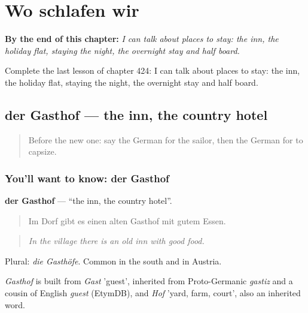 
\chapter{Wo schlafen wir}
\label{ch:ge-wo-schlafen-wir}

\begin{chapteropening}
\textbf{By the end of this chapter:} \emph{I can talk about places to stay: the inn, the holiday flat, staying the night, the overnight stay and half board.}

Complete the last lesson of chapter 424: I can talk about places to stay: the inn, the holiday flat, staying the night, the overnight stay and half board.
\end{chapteropening}

\section[der Gasthof]{der Gasthof — the inn, the country hotel}

\label{lesson:GE-C424-gasthof}



\begin{quote}
Before the new one: say the German for the sailor, then the German for to capsize.
\end{quote}

\subsection*{You'll want to know: der Gasthof}
\textbf{der Gasthof} — \textquotedblleft{}the inn, the country hotel\textquotedblright{}.

\begin{quote}
Im Dorf gibt es einen alten Gasthof mit gutem Essen.
\end{quote}

\begin{quote}
\emph{In the village there is an old inn with good food.}
\end{quote}

Plural: \emph{die Gasthöfe}. Common in the south and in Austria.

\begin{cousinweb}
\emph{Gasthof} is built from \emph{Gast} 'guest', inherited from Proto-Germanic \emph{gastiz} and a cousin of English \emph{guest} (EtymDB), and \emph{Hof} 'yard, farm, court', also an inherited word.
\end{cousinweb}

